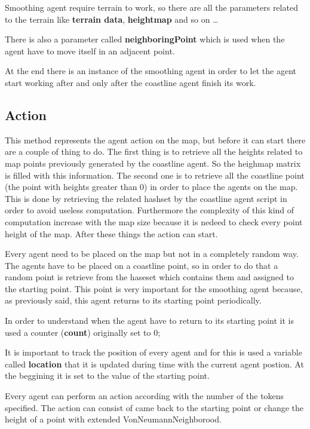 \documentclass[12pt]{article}
\begin{document}
    \noindent 
    Smoothing agent require terrain to work, so there are all the parameters related to the terrain like \textbf{terrain data}, \textbf{heightmap} and so on \dots

    \noindent
    There is also a parameter called \textbf{neighboringPoint} which is used when the agent have to move itself in an adjacent point.
    
    \noindent
    At the end there is an instance of the smoothing agent in order to let the agent start working after and only after the coastline agent finish its work.

    \subsection{Action}
    This method represents the agent action on the map, but before it can start there are a couple of thing to do.
    The first thing is to retrieve all the heights related to map points previously generated by the coastline agent. So the heighmap matrix is filled with this information.
    The second one is to retrieve all the coastline point (the point with heights greater than 0) in order to place the agents on the map. This is done by retrieving the
    related hashset by the coastline agent script in order to avoid useless computation. Furthermore the complexity of this kind of computation increase with the map size 
    because it is nedeed to check every point height of the map.
    After these things the action can start.

    Every agent need to be placed on the map but not in a completely random way. The agents have to be placed on a coastline point, so in order to do that a random point is retrieve
    from the haseset which contains them and assigned to the starting point. This point is very important for the smoothing agent because, as previously said, this agent returns
    to its starting point periodically.

    In order to understand when the agent have to return to its starting point it is used a counter (\textbf{count}) originally set to 0;
    
    It is important to track the position of every agent and for this is used a variable called \textbf{location} that it is updated during time with the current agent postion. 
    At the beggining it is set to the value of the starting point.

    Every agent can perform an action according with the number of the tokens specified. The action can consist of came back to the starting point or change the height of a point
    with extended VonNeumannNeighborood.
\end{document}

